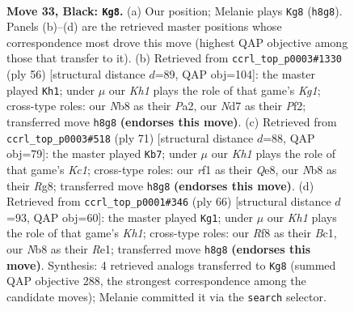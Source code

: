 \documentclass[11pt]{article}
\begin{document}
\clearpage

\begin{figure}[p]\centering
\begin{subfigure}{0.46\textwidth}\centering
\resizebox{\linewidth}{!}{%
\newchessgame
\chessboard[
  setfen={1n3r1k/2pnq2p/rp2p1p1/p3Pp2/P2P1P1P/1RP3N1/1K4PQ/4NR2 b - - 8 33},
  showmover=false,
  pgfstyle=straightmove, color=movearrow, markmove={h8-g8}
]}
\caption{}
\end{subfigure}\hfill
\begin{subfigure}{0.46\textwidth}\centering
\resizebox{\linewidth}{!}{%
\newchessgame
\chessboard[
  setfen={2r5/2qr1ppk/pp1ppnnp/8/2P1P3/1PNRQN1P/P4PP1/3R2K1 w - - 2 29},
  showmover=false,
  pgfstyle=straightmove, color=movearrow, markmove={g1-h1}
]}
\caption{}
\end{subfigure}
\\[4pt]
\begin{subfigure}{0.46\textwidth}\centering
\resizebox{\linewidth}{!}{%
\newchessgame
\chessboard[
  setfen={2k1q1r1/2nr1npp/p3p3/Pp1pPp1P/1BpP1N1Q/2P3R1/2P2PP1/2K4R b - - 37 36},
  showmover=false,
  pgfstyle=straightmove, color=movearrow, markmove={c8-b7}
]}
\caption{}
\end{subfigure}\hfill
\begin{subfigure}{0.46\textwidth}\centering
\resizebox{\linewidth}{!}{%
\newchessgame
\chessboard[
  setfen={3qr1k1/2r2ppn/3p2np/p1pP4/PpQ1PPP1/1P1N2R1/7P/2B1R2K w - - 5 34},
  showmover=false,
  pgfstyle=straightmove, color=movearrow, markmove={h1-g1}
]}
\caption{}
\end{subfigure}
\caption{\textbf{Move 33, Black: \texttt{Kg8}.} (a) Our position; Melanie plays \texttt{Kg8} (\texttt{h8g8}). Panels (b)--(d) are the retrieved master positions whose correspondence most drove this move (highest QAP objective among those that transfer to it). (b) Retrieved from \texttt{ccrl\_top\_p0003\#1330} (ply 56) [structural distance $d$=89, QAP obj=104]: the master played \texttt{Kh1}; under $\mu$ our \emph{Kh1} plays the role of that game's \emph{Kg1}; cross-type roles: our \emph{N}b8 as their \emph{P}a2, our \emph{N}d7 as their \emph{P}f2; transferred move \texttt{h8g8} \textbf{(endorses this move)}. (c) Retrieved from \texttt{ccrl\_top\_p0003\#518} (ply 71) [structural distance $d$=88, QAP obj=79]: the master played \texttt{Kb7}; under $\mu$ our \emph{Kh1} plays the role of that game's \emph{Kc1}; cross-type roles: our \emph{r}f1 as their \emph{Q}e8, our \emph{N}b8 as their \emph{R}g8; transferred move \texttt{h8g8} \textbf{(endorses this move)}. (d) Retrieved from \texttt{ccrl\_top\_p0001\#346} (ply 66) [structural distance $d$=93, QAP obj=60]: the master played \texttt{Kg1}; under $\mu$ our \emph{Kh1} plays the role of that game's \emph{Kh1}; cross-type roles: our \emph{R}f8 as their \emph{B}c1, our \emph{N}b8 as their \emph{R}e1; transferred move \texttt{h8g8} \textbf{(endorses this move)}. Synthesis: 4 retrieved analogs transferred to \texttt{Kg8} (summed QAP objective 288, the strongest correspondence among the candidate moves); Melanie committed it via the \texttt{search} selector.}
\label{fig:thought-m65}
\end{figure}
\end{document}
